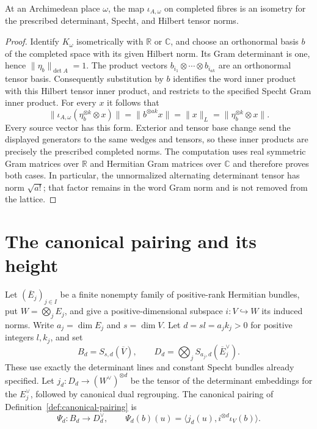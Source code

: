 \begin{lemma}
\label{lem:contraction-infinite-specht}
\leanok
At an Archimedean place $\omega$, the map $\iota_{A,\omega}$ on completed
fibres is an isometry for the prescribed determinant, Specht, and Hilbert
tensor norms.
\end{lemma}
\begin{proof}
Identify $K_\omega$ isometrically with $\mathbb R$ or $\mathbb C$, and
choose an orthonormal basis $b$ of the completed space with its given Hilbert
norm. Its Gram determinant is one, hence $\|\eta_b\|_{\det A}=1$.
The product vectors $b_{i_1}\otimes\cdots\otimes b_{i_{ak}}$ are an
orthonormal tensor basis. Consequently substitution by $b$ identifies the
word inner product with this Hilbert tensor inner product, and restricts to
the specified Specht Gram inner product. For every $x$ it follows that
\[
 \|\iota_{A,\omega}(\eta_b^{\otimes k}\otimes x)\|
 =\|b^{\otimes ak}x\|=\|x\|_L
 =\|\eta_b^{\otimes k}\otimes x\|.
\]
Every source vector has this form. Exterior and tensor base change send the
displayed generators to the same wedges and tensors, so these inner products
are precisely the prescribed completed norms. The computation uses real
symmetric Gram matrices over $\mathbb R$ and Hermitian Gram matrices over
$\mathbb C$ and therefore proves both cases. In particular, the
unnormalized alternating determinant tensor has norm $\sqrt{a!}$; that
factor remains in the word Gram norm and is not removed from the lattice.
\end{proof}

\section{The canonical pairing and its height}

Let $(\overline E_j)_{j\in I}$ be a finite nonempty family of positive-rank
Hermitian bundles, put $W=\bigotimes_j E_j$, and give a positive-dimensional
subspace $i:V\hookrightarrow W$ its induced norms. Write $a_j=\dim E_j$
and $s=\dim V$. Let $d=sl=a_jk_j>0$ for positive integers $l,k_j$, and set
\[
 B_d=S_{s,d}(\overline V),\qquad
 D_d=\bigotimes_j S_{a_j,d}(\overline E_j^\vee).
\]
These use exactly the determinant lines and constant Specht bundles already
specified. Let $j_d:D_d\to(W^\vee)^{\otimes d}$ be the tensor of the
determinant embeddings for the $E_j^\vee$, followed by canonical dual
regrouping. The canonical pairing of Definition~\ref{def:canonical-pairing} is
\[
 \Psi_d:B_d\longrightarrow D_d^\vee,\qquad
 \Psi_d(b)(u)=\langle j_d(u),i^{\otimes d}\iota_V(b)\rangle.
\]

